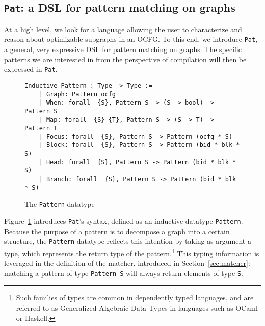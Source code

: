 \documentclass[11pt]{article}
\newcommand{\inlinecoq}[1]{\mbox{\lstinline[style=customcoq,columns=fixed,basewidth=.48em]{#1}}}
\newcommand{\ilc}[1]{\inlinecoq{#1}}
\newcommand{\yzt}[1]{\textcolor{ForestGreen!50}{#1}}
\newcommand{\cut}[1]{\textcolor{Gray!40}{#1}}
\newcommand{\ocfg}{OCFG\xspace}
\newcommand{\pat}{\texttt{Pat}\xspace}
\begin{document}

\subsection{\pat: a DSL for pattern matching on graphs}

\yzt{At a high level, we look for a language allowing the user to characterize and reason about optimizable subgraphs in an \ocfg. 
To this end, we introduce \pat, a general, very expressive DSL for pattern matching on graphs. The specific patterns we are interested in from the perspective of compilation will then be expressed in \pat.}

\begin{figure}
  \begin{lstlisting}[style=customcoq,basicstyle=\small\ttfamily]
    Inductive Pattern : Type -> Type :=
    | Graph: Pattern ocfg
    | When: forall  {S}, Pattern S -> (S -> bool) -> Pattern S
    | Map: forall  {S} {T}, Pattern S -> (S -> T) -> Pattern T
    | Focus: forall  {S}, Pattern S -> Pattern (ocfg * S)
    | Block: forall  {S}, Pattern S -> Pattern (bid * blk * S)
    | Head: forall  {S}, Pattern S -> Pattern (bid * blk * S)
    | Branch: forall  {S}, Pattern S -> Pattern (bid * blk * S)
  \end{lstlisting}
  \caption{The \ilc{Pattern} datatype}
  \label{fig:pat}
\end{figure}

Figure~\ref{fig:pat} introduces \pat{}'s syntax, defined as an inductive datatype \ilc{Pattern}.
Because the purpose of a pattern is to decompose a graph into a certain structure, the \ilc{Pattern} datatype reflects this intention by taking as argument a type, which represents the return type of the pattern.\footnote{Such families of types are common in dependently typed languages, and are referred to as Generalized Algebraic Data Types in languages such as OCaml or Haskell.}
This typing information is leveraged in the definition of the matcher, introduced in Section~\ref{sec:matcher}: matching a pattern of type \ilc{Pattern S} will always return elements of type \ilc{S}.
\end{document}
